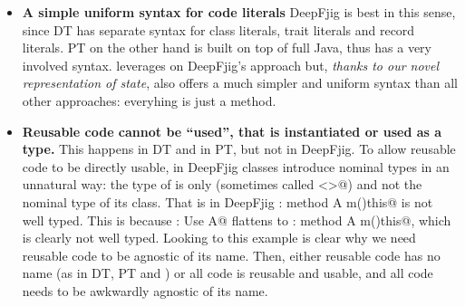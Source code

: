 \begin{itemize}
\item {\bf A simple uniform syntax for code literals}
DeepFjig is best in this sense, since DT has separate syntax for class literals, trait literals and record literals.
PT on the other hand is built on top of full Java, thus has a very
involved syntax.
\name leverages on DeepFjig's approach but,
\emph{thanks to our novel representation of state}, \name also offers a much simpler and uniform syntax than
all other approaches: everyhing is just a method.
\item 
{\bf Reusable code cannot be ``used'', that is instantiated or used as a type.}
This happens in DT and in PT, but not in DeepFjig. To allow reusable code to be directly 
usable, in DeepFjig
classes introduce nominal types in an unnatural way: the type of
\Q@this@ is only \Q@This@ (sometimes called \Q@<>@) and not the
nominal type of its class. 
That is in DeepFjig 
\Q@A:{ method A m()this}@ is not well typed. This is because
\Q@B: Use A@ flattens to \Q@B:{ method A m()this}@, which is clearly not well typed.
Looking to this example is clear why we need reusable code to be agnostic of its name.
Then, either reusable code has no name (as in DT, PT and \name)
or all code is reusable and usable, and all code needs to be awkwardly agnostic of its name.


\end{itemize}
